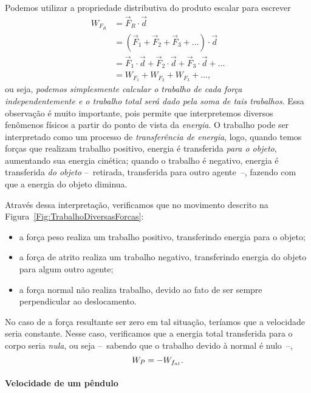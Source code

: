 Podemos utilizar a propriedade distributiva do produto escalar para escrever
\begin{align}
    W_{F_R} &= \vec{F}_R \cdot \vec{d} \\
    &= (\vec{F}_1 + \vec{F}_2 + \vec{F}_3 + \dots) \cdot \vec{d} \\
    &= \vec{F}_1 \cdot \vec{d} + \vec{F}_2 \cdot \vec{d} + \vec{F}_3 \cdot \vec{d} + \dots \\
    &= W_{F_1} + W_{F_2} +  W_{F_3} + \dots, 
\end{align}
%
ou seja, \emph{podemos simplesmente calcular o trabalho de cada força independentemente e o trabalho total será dado pela soma de tais trabalhos}. Essa observação é muito importante, pois permite que interpretemos diversos fenômenos físicos a partir do ponto de vista da \emph{energia}. O trabalho pode ser interpretado como um processo de \emph{transferência de energia}, logo, quando temos forças que realizam trabalho positivo, energia é transferida \emph{para o objeto}, aumentando sua energia cinética; quando o trabalho é negativo, energia é transferida \emph{do objeto} --~retirada, transferida para outro agente~--, fazendo com que a energia do objeto diminua.

Através dessa interpretação, verificamos que no movimento descrito na Figura~\ref{Fig:TrabalhoDiversasForcas}:
\begin{itemize}
    \item a força peso realiza um trabalho positivo, transferindo energia para o objeto;
    \item a força de atrito realiza um trabalho negativo, transferindo energia do objeto para algum outro agente;
    \item a força normal não realiza trabalho, devido ao fato de ser sempre perpendicular ao deslocamento.
\end{itemize}
%
No caso de a força resultante ser zero em tal situação, teríamos que a velocidade seria constante. Nesse caso, verificamos que a energia total transferida para o corpo seria \emph{nula}, ou seja --~sabendo que o trabalho devido à normal é nulo~--,
\begin{equation}
  W_P = - W_{f_{at}}.
\end{equation}

\paragraph{Velocidade de um pêndulo}

